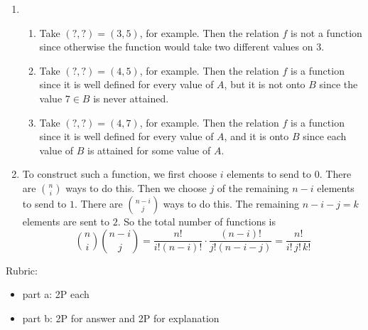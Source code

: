 \documentclass{article}
\theoremstyle{definition}
\begin{document}
\begin{solution}
\begin{enumerate}
	\item 
	\begin{enumerate}
		\item Take $(?,?) = (3,5)$, for example. Then the relation $f$ is not a function since  otherwise the function would take two different values on $3$.
		\item Take $(?,?) = (4,5)$, for example. Then the relation $f$ is a function since it is well defined for every value of $A$,  but it is not onto $B$ since the value $7\in B$ is never attained. 
		\item Take $(?,?) = (4,7)$, for example. Then the relation $f$ is a function since it is well defined for every value of $A$,  and it is onto $B$ since each value of $ B$ is attained for some value of $A$. 
	\end{enumerate}

	\item      To construct such a function, we first choose $i$ elements to send to $0$.
	There are $\binom{n}{i}$ ways to do this.  Then we choose $j$ of the remaining
	$n-i$ elements to send to $1$.  There are $\binom{n-i}{j}$ ways to do this.
	The remaining $n-i-j = k$ elements are sent to $2$.  So the total number
	of functions is
	\[
	\binom{n}{i} \binom{n-i}{j}
	= \frac{n!}{i!(n-i)!} \cdot \frac{(n-i)!}{j!(n-i-j)}
	= \frac{n!}{i!\,j!\,k!}
	\]

\end{enumerate}
{\color{red} Rubric:
\begin{itemize}
\item part a: 2P each
\item part b: 2P for answer and 2P for explanation
\end{itemize}}


\end{solution}
\end{document}
